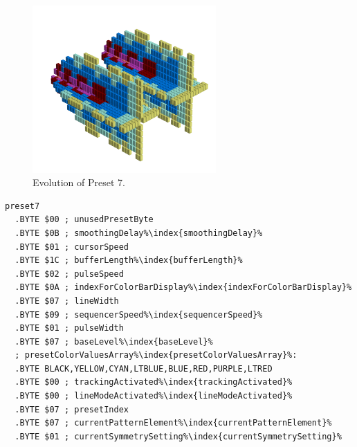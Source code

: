 \clearpage
\begin{minipage}[b]{0.48\linewidth}


                                                                 
\begin{figure}[H]                                                          
  \centering                                                             
  \begin{adjustbox}{width=7cm,center}                                   
  \includegraphics[width=7cm]{src/presets/pattern7-45.png}%
  \end{adjustbox}                                                        
\caption{Evolution of Preset 7.}                                           
\end{figure}                                                               
                                                                 
                                                                           
\end{minipage}
\hspace{0.1cm}
\begin{minipage}[b]{0.48\linewidth}                                       
\begin{lstlisting}[basicstyle=\ttfamily\scriptsize,caption=Data structure for Preset 7.,escapechar=\%]
preset7
  .BYTE $00 ; unusedPresetByte
  .BYTE $0B ; smoothingDelay%\index{smoothingDelay}%
  .BYTE $01 ; cursorSpeed
  .BYTE $1C ; bufferLength%\index{bufferLength}%
  .BYTE $02 ; pulseSpeed
  .BYTE $0A ; indexForColorBarDisplay%\index{indexForColorBarDisplay}%
  .BYTE $07 ; lineWidth
  .BYTE $09 ; sequencerSpeed%\index{sequencerSpeed}%
  .BYTE $01 ; pulseWidth
  .BYTE $07 ; baseLevel%\index{baseLevel}%
  ; presetColorValuesArray%\index{presetColorValuesArray}%: 
  .BYTE BLACK,YELLOW,CYAN,LTBLUE,BLUE,RED,PURPLE,LTRED
  .BYTE $00 ; trackingActivated%\index{trackingActivated}%
  .BYTE $00 ; lineModeActivated%\index{lineModeActivated}%
  .BYTE $07 ; presetIndex
  .BYTE $07 ; currentPatternElement%\index{currentPatternElement}%
  .BYTE $01 ; currentSymmetrySetting%\index{currentSymmetrySetting}%
\end{lstlisting}
\end{minipage}

